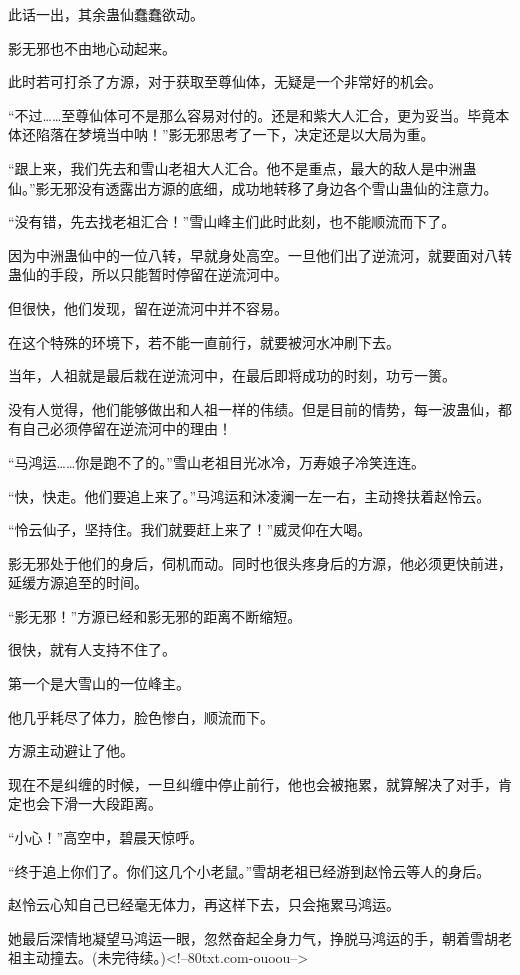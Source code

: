 \begin{this_body}
此话一出，其余蛊仙蠢蠢欲动。

影无邪也不由地心动起来。

此时若可打杀了方源，对于获取至尊仙体，无疑是一个非常好的机会。

“不过……至尊仙体可不是那么容易对付的。还是和紫大人汇合，更为妥当。毕竟本体还陷落在梦境当中呐！”影无邪思考了一下，决定还是以大局为重。

“跟上来，我们先去和雪山老祖大人汇合。他不是重点，最大的敌人是中洲蛊仙。”影无邪没有透露出方源的底细，成功地转移了身边各个雪山蛊仙的注意力。

“没有错，先去找老祖汇合！”雪山峰主们此时此刻，也不能顺流而下了。

因为中洲蛊仙中的一位八转，早就身处高空。一旦他们出了逆流河，就要面对八转蛊仙的手段，所以只能暂时停留在逆流河中。

但很快，他们发现，留在逆流河中并不容易。

在这个特殊的环境下，若不能一直前行，就要被河水冲刷下去。

当年，人祖就是最后栽在逆流河中，在最后即将成功的时刻，功亏一篑。

没有人觉得，他们能够做出和人祖一样的伟绩。但是目前的情势，每一波蛊仙，都有自己必须停留在逆流河中的理由！

“马鸿运……你是跑不了的。”雪山老祖目光冰冷，万寿娘子冷笑连连。

“快，快走。他们要追上来了。”马鸿运和沐凌澜一左一右，主动搀扶着赵怜云。

“怜云仙子，坚持住。我们就要赶上来了！”威灵仰在大喝。

影无邪处于他们的身后，伺机而动。同时也很头疼身后的方源，他必须更快前进，延缓方源追至的时间。

“影无邪！”方源已经和影无邪的距离不断缩短。

很快，就有人支持不住了。

第一个是大雪山的一位峰主。

他几乎耗尽了体力，脸色惨白，顺流而下。

方源主动避让了他。

现在不是纠缠的时候，一旦纠缠中停止前行，他也会被拖累，就算解决了对手，肯定也会下滑一大段距离。

“小心！”高空中，碧晨天惊呼。

“终于追上你们了。你们这几个小老鼠。”雪胡老祖已经游到赵怜云等人的身后。

赵怜云心知自己已经毫无体力，再这样下去，只会拖累马鸿运。

她最后深情地凝望马鸿运一眼，忽然奋起全身力气，挣脱马鸿运的手，朝着雪胡老祖主动撞去。(未完待续。)<!--80txt.com-ouoou-->

\end{this_body}

